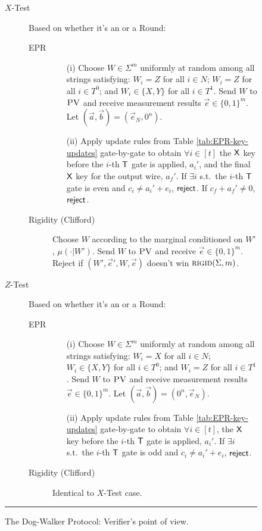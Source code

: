 \begin{figure}[H]
\begin{description}
\begin{description}
\begin{enumerate}
		\end{enumerate}
	\end{description}
\item[$X$-Test] Based on whether it's an  or a  Round:
\begin{description}
	\item[EPR] 
	\begin{enumerate}
		\item[(i)] Choose $W\in\Sigma^m$ uniformly at random among all strings satisfying: $W_i=Z$ for all $i\in N$; $W_i=Z$ for all $i\in T^0$; and $W_i\in\{X,Y\}$ for all $i\in T^1$. Send $W$ to $\textsc{PV}$ and receive measurement results $\vec{e}\in\{0,1\}^m$. Let $(\vec{a},\vec{b})=(\vec{e}_N,0^n)$. 
		\item[(ii)] Apply update rules from Table \ref{tab:EPR-key-updates} gate-by-gate to obtain $\forall i\in [t]$ the $\sf X$ key before the $i$-th $\sf T$ gate is applied, $a_i'$, and the final $\sf X$ key for the output wire, $a_f'$. 
If $\exists i$ s.t.\ the $i$-th $\sf T$ gate is even and $c_i\neq a_i'+e_i$, $\sf reject$. If $c_f+a_f'\neq 0$, $\sf reject$. 
	\end{enumerate}
	\item[Rigidity (Clifford)] Choose ${W}$ according to the marginal conditioned on ${W}'$, $\mu(\cdot|{W}')$. 
	Send ${W}$ to $\textsc{PV}$ and receive $\vec{e}\in\{0,1\}^m$. Reject if   $({W}',\vec{e}',{W},\vec{e})$ doesn't win $\textsc{rigid}(\Sigma,m)$. 
\end{description}

\item[$Z$-Test] Based on whether it's an  or a  Round:
\begin{description}
	\item[EPR] 
	\begin{enumerate}
		\item[(i)] Choose $W\in\Sigma^m$ uniformly at random among all strings satisfying: $W_i=X$ for all $i\in N$; $W_i\in\{X,Y\}$ for all $i\in T^0$; and $W_i=Z$ for all $i\in T^1$. Send $W$ to $\textsc{PV}$ and receive measurement results $\vec{e}\in\{0,1\}^m$. Let $(\vec{a},\vec{b})=(0^n,\vec{e}_N)$.
		\item[(ii)] Apply update rules from Table \ref{tab:EPR-key-updates} gate-by-gate to obtain $\forall i\in [t]$, the $\sf X$ key before the $i$-th $\sf T$ gate is applied, $a_i'$. 
If $\exists i$ s.t.\ the $i$-th $\sf T$ gate is odd and $c_i\neq a_i'+e_i$, $\sf reject$. 
	\end{enumerate}
	\item[Rigidity (Clifford)] Identical to $X$-Test case.
\end{description}
\end{description}
\rule[2ex]{\textwidth}{0.5pt}\vspace{-.5cm}
\caption{The Dog-Walker Protocol: Verifier's point of view.}\label{fig:dogwalker-protocol-V}
\end{figure}



